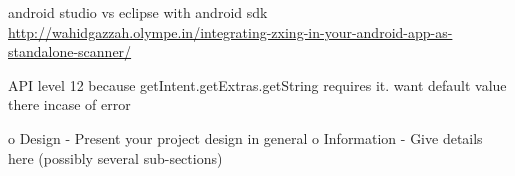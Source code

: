 android studio vs eclipse with android sdk
\url{http://wahidgazzah.olympe.in/integrating-zxing-in-your-android-app-as-standalone-scanner/}

API level 12 because getIntent.getExtras.getString requires it. want default value there incase of error

o   Design - Present your project design in general
o   Information - Give details here (possibly several sub-sections)